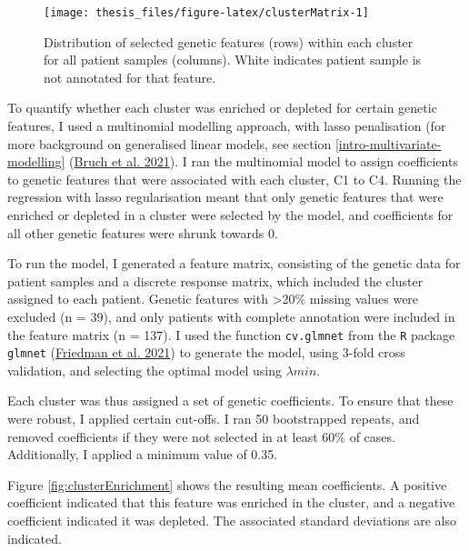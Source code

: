\documentclass[11pt, a4paper, twosided]{book}
\begin{document}
\begin{figure}

{\centering \texttt{[image: thesis\_files/figure-latex/clusterMatrix-1]} 

}

\caption{Distribution of selected genetic features (rows) within each cluster for all patient samples (columns). White indicates patient sample is not annotated for that feature.}\label{fig:clusterMatrix}
\end{figure}
To quantify whether each cluster was enriched or depleted for certain genetic features, I used a multinomial modelling approach, with lasso penalisation (for more background on generalised linear models, see section \ref{intro-multivariate-modelling} (\protect\hyperlink{ref-Giles2021}{Bruch et al. 2021}).
I ran the multinomial model to assign coefficients to genetic features that were associated with each cluster, C1 to C4. Running the regression with lasso regularisation meant that only genetic features that were enriched or depleted in a cluster were selected by the model, and coefficients for all other genetic features were shrunk towards 0.

To run the model, I generated a feature matrix, consisting of the genetic data for patient samples and a discrete response matrix, which included the cluster assigned to each patient. Genetic features with \textgreater20\% missing values were excluded (n = 39), and only patients with complete annotation were included in the feature matrix (n = 137). I used the function \texttt{cv.glmnet} from the \texttt{R} package \texttt{glmnet} (\protect\hyperlink{ref-R-glmnet}{Friedman et al. 2021}) to generate the model, using 3-fold cross validation, and selecting the optimal model using \(\lambda{min}\).

Each cluster was thus assigned a set of genetic coefficients. To ensure that these were robust, I applied certain cut-offs. I ran 50 bootstrapped repeats, and removed coefficients if they were not selected in at least 60\% of cases. Additionally, I applied a minimum value of 0.35.

Figure \ref{fig:clusterEnrichment} shows the resulting mean coefficients. A positive coefficient indicated that this feature was enriched in the cluster, and a negative coefficient indicated it was depleted. The associated standard deviations are also indicated.
\end{document}
